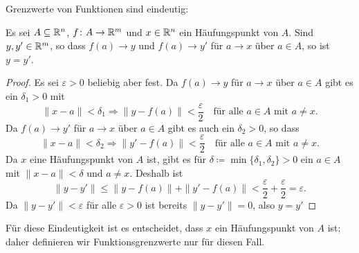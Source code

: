 \documentclass[a4paper,10pt]{article}
\begin{document}
Grenzwerte von Funktionen sind eindeutig:


\begin{lem}
 Es sei $A \subseteq \mathbb{R}^n$, $f \colon A \to \mathbb{R}^m$ und $x \in \mathbb{R}^n$ ein Häufungspunkt von $A$. Sind $y, y' \in \mathbb{R}^m$, so dass $f(a) \to y$ und $f(a) \to y'$ für $a \to x$ über $a \in A$, so ist $y = y'$.
\end{lem}
\begin{proof}
 Es sei $\varepsilon > 0$ beliebig aber fest. Da $f(a) \to y$ für $a \to x$ über $a \in A$ gibt es ein $\delta_1 > 0$ mit
 \[
  \|x-a\| < \delta_1 \Rightarrow \|y-f(a)\| < \frac{\varepsilon}{2}
  \quad \text{für alle $a \in A$ mit $a \neq x$}.
 \]
 Da $f(a) \to y'$ für $a \to x$ über $a \in A$ gibt es auch ein $\delta_2 > 0$, so dass
 \[
  \|x-a\| < \delta_2 \Rightarrow \|y'-f(a)\| < \frac{\varepsilon}{2}
  \quad \text{für alle $a \in A$ mit $a \neq x$}.
 \]
 Da $x$ eine Häufungspunkt von $A$ ist, gibt es für $\delta \coloneqq \min \{\delta_1, \delta_2\} > 0$ ein $a \in A$ mit $\|x-a\| < \delta$ und $a \neq x$. Deshalb ist
 \[
  \|y-y'\|
  \leq \|y-f(a)\| + \|y'-f(a)\|
  < \frac{\varepsilon}{2} + \frac{\varepsilon}{2}
  = \varepsilon.
 \]
 Da $\|y-y'\| < \varepsilon$ für alle $\varepsilon > 0$ ist bereits $\|y-y'\| = 0$, also $y = y'$
\end{proof}


Für diese Eindeutigkeit ist es entscheidet, dass $x$ ein Häufungspunkt von $A$ ist; daher definieren wir Funktionsgrenzwerte nur für diesen Fall.
\end{document}
